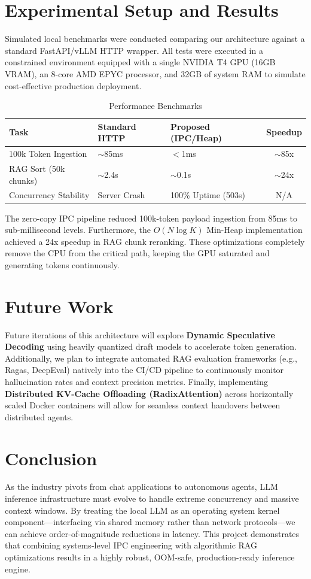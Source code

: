\documentclass[conference]{IEEEtran}
\begin{document}
\section{Experimental Setup and Results}

Simulated local benchmarks were conducted comparing our architecture against a standard FastAPI/vLLM HTTP wrapper. All tests were executed in a constrained environment equipped with a single NVIDIA T4 GPU (16GB VRAM), an 8-core AMD EPYC processor, and 32GB of system RAM to simulate cost-effective production deployment.

\begin{table}[h]
\centering
\caption{Performance Benchmarks}
\begin{tabular}{@{}lllc@{}}
\toprule
\textbf{Task} & \textbf{Standard HTTP} & \textbf{Proposed (IPC/Heap)} & \textbf{Speedup} \\ \midrule
100k Token Ingestion & $\sim$85ms & $<$1ms & $\sim$85x \\
RAG Sort (50k chunks) & $\sim$2.4s & $\sim$0.1s & $\sim$24x \\
Concurrency Stability & Server Crash & 100\% Uptime (503s) & N/A \\ \bottomrule
\end{tabular}
\end{table}

The zero-copy IPC pipeline reduced 100k-token payload ingestion from 85ms to sub-millisecond levels. Furthermore, the $O(N \log K)$ Min-Heap implementation achieved a 24x speedup in RAG chunk reranking. These optimizations completely remove the CPU from the critical path, keeping the GPU saturated and generating tokens continuously.

\section{Future Work}
Future iterations of this architecture will explore \textbf{Dynamic Speculative Decoding} using heavily quantized draft models to accelerate token generation. Additionally, we plan to integrate automated RAG evaluation frameworks (e.g., Ragas, DeepEval) natively into the CI/CD pipeline to continuously monitor hallucination rates and context precision metrics. Finally, implementing \textbf{Distributed KV-Cache Offloading (RadixAttention)} across horizontally scaled Docker containers will allow for seamless context handovers between distributed agents.

\section{Conclusion}
As the industry pivots from chat applications to autonomous agents, LLM inference infrastructure must evolve to handle extreme concurrency and massive context windows. By treating the local LLM as an operating system kernel component—interfacing via shared memory rather than network protocols—we can achieve order-of-magnitude reductions in latency. This project demonstrates that combining systems-level IPC engineering with algorithmic RAG optimizations results in a highly robust, OOM-safe, production-ready inference engine.
\end{document}
